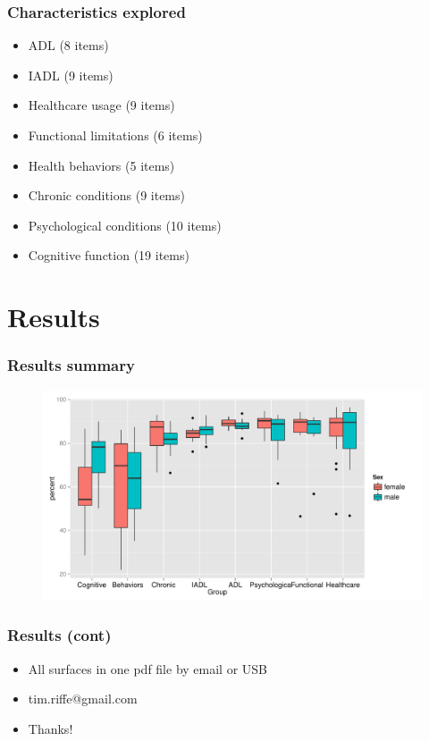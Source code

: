\documentclass{beamer}
\begin{document}
\begin{frame}
\frametitle{Characteristics explored}
\begin{itemize}
  \item ADL (8 items)
  \item IADL (9 items)
  \item Healthcare usage (9 items)
  \item Functional limitations (6 items)
  \item Health behaviors (5 items)
  \item Chronic conditions (9 items)
  \item Psychological conditions (10 items)
  \item Cognitive function (19 items)
\end{itemize}
\end{frame}


\section{Results}


\begin{frame}
\frametitle{Results summary}
\begin{figure}
\includegraphics[width=.8\linewidth]{Figures/ResultsBoxplot}
\end{figure}
\end{frame}


\begin{frame}
\frametitle{Results (cont)}
\begin{itemize}
  \item All surfaces in one pdf file by email or USB
  \item tim.riffe@gmail.com
  \item Thanks!
\end{itemize}
\end{frame}

\end{document}
